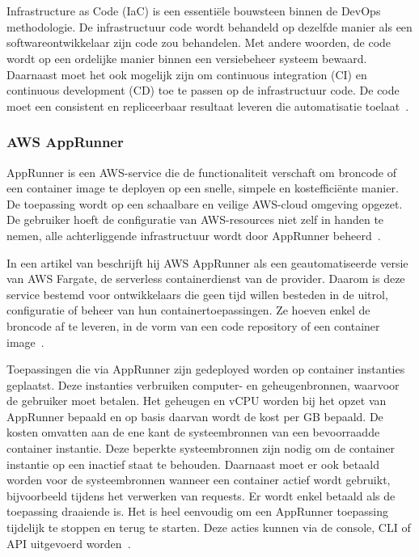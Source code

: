 \chapter{}
\label{ch:stand-van-zaken}

Infrastructure as Code (IaC) is een essentiële bouwsteen binnen de DevOps methodologie.
De infrastructuur code wordt behandeld op dezelfde manier als een softwareontwikkelaar zijn code zou behandelen.
Met andere woorden, de code wordt op een ordelijke manier binnen een versiebeheer systeem bewaard.
Daarnaast moet het ook mogelijk zijn om continuous integration (CI) en continuous development (CD) toe te passen op de infrastructuur code.
De code moet een consistent en repliceerbaar resultaat leveren die automatisatie toelaat~\autocite{Mansoor2014}.

\subsection{AWS AppRunner}
\label{sec:service-apprunner}

AppRunner is een AWS-service die de functionaliteit verschaft om broncode of een container image te deployen op een snelle, simpele en kostefficiënte manier.
De toepassing wordt op een schaalbare en veilige AWS-cloud omgeving opgezet.
De gebruiker hoeft de configuratie van AWS-resources niet zelf in handen te nemen, alle achterliggende infrastructuur wordt door AppRunner beheerd~\autocite{Khen2022}.

In een artikel van \textcite{Aussems2021} beschrijft hij AWS AppRunner als een geautomatiseerde versie van AWS Fargate, de serverless containerdienst van de provider.
Daarom is deze service bestemd voor ontwikkelaars die geen tijd willen besteden in de uitrol, configuratie of beheer van hun containertoepassingen.
Ze hoeven enkel de broncode af te leveren, in de vorm van een code repository of een container image~\autocite{Khen2022}.

Toepassingen die via AppRunner zijn gedeployed worden op container instanties geplaatst.
Deze instanties verbruiken computer- en geheugenbronnen, waarvoor de gebruiker moet betalen.
Het geheugen en vCPU worden bij het opzet van AppRunner bepaald en op basis daarvan wordt de kost per GB bepaald.
De kosten omvatten aan de ene kant de systeembronnen van een bevoorraadde container instantie.
Deze beperkte systeembronnen zijn nodig om de container instantie op een inactief staat te behouden.
Daarnaast moet er ook betaald worden voor de systeembronnen wanneer een container actief wordt gebruikt, bijvoorbeeld tijdens het verwerken van requests.
Er wordt enkel betaald als de toepassing draaiende is.
Het is heel eenvoudig om een AppRunner toepassing tijdelijk te stoppen en terug te starten.
Deze acties kunnen via de console, CLI of API uitgevoerd worden~\autocite{AWSAppRunnerPricing}.

